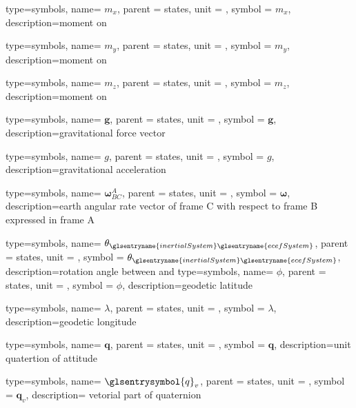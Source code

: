{type=symbols,
  name= \ensuremath{m_{x}},
  parent = {states},
  unit = \unexpanded{\si{\newton\meter}},
  symbol = \ensuremath{m_{x}},
  description={moment on }
}

{type=symbols,
  name= \ensuremath{m_{y}},
  parent = {states},
  unit = \unexpanded{\si{\newton\meter}},
  symbol = \ensuremath{m_{y}},
  description={moment on }
}

{type=symbols,
  name= \ensuremath{m_{z}},
  parent = {states},
  unit = \unexpanded{\si{\newton\meter}},
  symbol = \ensuremath{m_{z}},
  description={moment on }
}

{type=symbols,
  name= \ensuremath{\mathbf{g}},
  parent = {states},
  unit = \unexpanded{},
  symbol = \ensuremath{\mathbf{g}},
  description={gravitational force vector}
}

{type=symbols,
  name= \ensuremath{g},
  parent = {states},
  unit = \unexpanded{\si{\meter\per\second\squared}},
  symbol = \ensuremath{g},
  description={gravitational acceleration}
}

{type=symbols,
  name= \ensuremath{\boldsymbol{\omega}_{BC}^{A}},
  parent = {states},
  unit = \unexpanded{\si{\radian\per\second}},
  symbol = \ensuremath{\boldsymbol{\omega}},
  description={earth angular rate vector of frame C with respect to frame B expressed in frame A}
}

{type=symbols,
  name= \ensuremath{\theta_{\glsentryname{inertialSystem}\glsentryname{ecefSystem}}},
  parent = {states},
  unit = \unexpanded{\si{\radian\per\second}},
  symbol = \ensuremath{\theta_{\glsentryname{inertialSystem}\glsentryname{ecefSystem}}},
  description={rotation angle between  and }
}
{type=symbols,
  name= \ensuremath{\phi},
  parent = {states},
  unit = \unexpanded{\si{\radian}},
  symbol = \ensuremath{\phi},
  description={geodetic latitude}
}

{type=symbols,
  name= \ensuremath{\lambda},
  parent = {states},
  unit = \unexpanded{\si{\radian}},
  symbol = \ensuremath{\lambda},
  description={geodetic longitude}
}


{type=symbols,
  name= \ensuremath{\mathbf{q}},
  parent = {states},
  unit = \unexpanded{},
  symbol = \ensuremath{\mathbf{q}},
  description={unit quatertion of attitude}
}

{type=symbols,
  name= \ensuremath{\glsentrysymbol{q}_v},
  parent = {states},
  unit = {},
  symbol = \ensuremath{\mathbf{q}_v},
  description={ vetorial part of quaternion }
}

